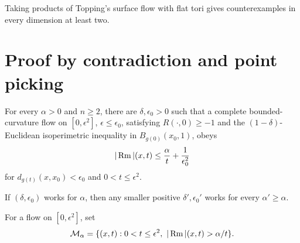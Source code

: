 \begin{remark}
\label{rem:chow-iii-topping-products}

Taking products of Topping's surface flow with flat tori gives counterexamples
in every dimension at least two.
\end{remark}

\section{Proof by contradiction and point picking}

\begin{theorem}[\(r_0=1\) case of pseudolocality]
\label{thm:chow-iii-pseudolocality-unit-scale}

For every \(\alpha>0\) and \(n\ge2\), there are \(\delta,\epsilon_0>0\) such
that a complete bounded-curvature flow on \([0,\epsilon^2]\), \(\epsilon\le
\epsilon_0\), satisfying \(R(\cdot,0)\ge-1\) and the \((1-\delta)\)-Euclidean
isoperimetric inequality in \(B_{g(0)}(x_0,1)\), obeys
\[
|\operatorname{Rm}|(x,t)\le\frac\alpha t+\frac1{\epsilon_0^2}
\]
for \(d_{g(t)}(x,x_0)<\epsilon_0\) and \(0<t\le\epsilon^2\).
\end{theorem}

\begin{remark}
\label{rem:chow-iii-pseudolocality-parameter-monotonicity}


If \((\delta,\epsilon_0)\) works for \(\alpha\), then any smaller positive
\(\delta',\epsilon_0'\) works for every \(\alpha'\ge\alpha\).
\end{remark}

\begin{definition}
\label{def:chow-iii-alpha-large-curvature}

For a flow on \([0,\epsilon^2]\), set
\[
\mathcal M_\alpha=\{(x,t):0<t\le\epsilon^2,\ |\Rm|(x,t)>\alpha/t\}.
\]
\end{definition}

